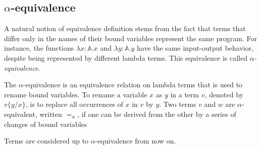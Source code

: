 
\subsection{$\alpha$-equivalence}
 
A natural notion of equivalence definition stems from the fact that terms that differ only in the names of their bound variables represent the same program. For instance, the functions $\lambda x:\mathbb{A}.x $ and $\lambda y:\mathbb{A}.y$ have the same input-output behavior, despite being represented by different lambda terms. This equivalence is called $\alpha$\emph{-equivalence}.

\begin{definition}
  The $\alpha$-equivalence is an equivalence relation on lambda terms that is used to rename bound variables. To rename a variable $x$ as $y$ in a term $v$, denoted by $v\{y/x\}$, is to replace all occurrences of $x$ in $v$ by $y$. Two terms $v$ and $w$ are $\alpha$-equivalent, written $=_{\alpha}$, if one can be derived from the other by a series of
  changes of bound variables
\end{definition}

\begin{convention}
  Terms are considered up to $\alpha$-equivalence from now on.
\end{convention}

